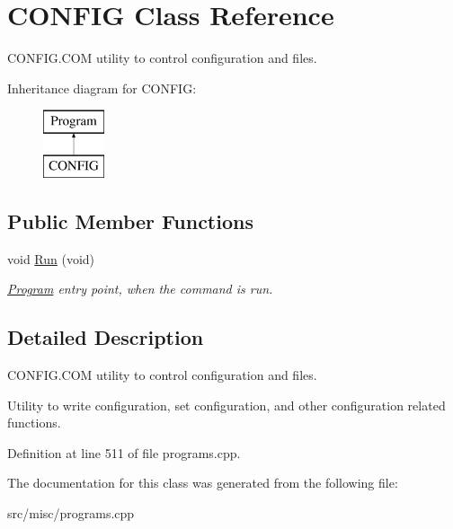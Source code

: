 \hypertarget{classCONFIG}{\section{C\-O\-N\-F\-I\-G Class Reference}
\label{classCONFIG}
}


C\-O\-N\-F\-I\-G.\-C\-O\-M utility to control configuration and files.  


Inheritance diagram for C\-O\-N\-F\-I\-G\-:\begin{figure}[H]
\begin{center}
\leavevmode
\includegraphics[height=2.000000cm]{classCONFIG}
\end{center}
\end{figure}
\subsection*{Public Member Functions}
\begin{DoxyCompactItemize}
\item 
\hypertarget{classCONFIG_a70fa41a171a274d6f1ef63cbfd2928ef}{void \hyperlink{classCONFIG_a70fa41a171a274d6f1ef63cbfd2928ef}{Run} (void)}\label{classCONFIG_a70fa41a171a274d6f1ef63cbfd2928ef}

\begin{DoxyCompactList}\small\item\em \hyperlink{classProgram}{Program} entry point, when the command is run. \end{DoxyCompactList}\end{DoxyCompactItemize}


\subsection{Detailed Description}
C\-O\-N\-F\-I\-G.\-C\-O\-M utility to control configuration and files. 

Utility to write configuration, set configuration, and other configuration related functions. 

Definition at line 511 of file programs.\-cpp.



The documentation for this class was generated from the following file\-:\begin{DoxyCompactItemize}
\item 
src/misc/programs.\-cpp\end{DoxyCompactItemize}

